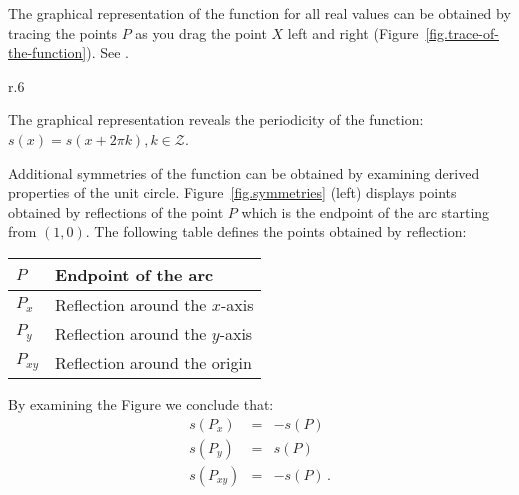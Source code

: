 The graphical representation of the function for all real values can be obtained by tracing the points $P$ as you drag the point $X$ left and right (Figure~\ref{fig.trace-of-the-function}). See .

\begin{wrapfigure}[12]{r}{.6\textwidth}
\begin{center}
\vspace{-2ex}
\caption{Trace of the function}\label{fig.trace-of-the-function}
\end{center}
\end{wrapfigure}


The graphical representation reveals the periodicity of the function: $s(x) = s(x + 2\pi k), k\in \mathcal{Z}$.

Additional symmetries of the function can be obtained by examining derived properties of the unit circle. Figure~\ref{fig.symmetries} (left) displays points obtained by reflections of the point $P$ which is the endpoint of the arc starting from $(1,0)$. The following table defines the points obtained by reflection:
\begin{center}
\begin{tabular}{|l|l|}
\hline
$P$ & Endpoint of the arc\\\hline
$P_x$ & Reflection around the $x$-axis\\\hline
$P_y$ & Reflection around the $y$-axis\\\hline
$P_{xy}$ & Reflection around the origin\\\hline
\end{tabular}
\end{center}
By examining the Figure we conclude that:
\begin{eqnarray*}
s(P_x) &=& -s(P)\\
s(P_y) &=& s(P)\\
s(P_{xy}) &=& -s(P)\,.
\end{eqnarray*}

